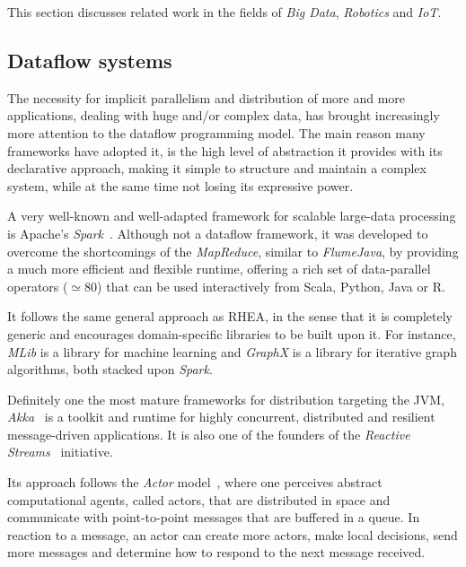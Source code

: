\documentclass[sigplan,review,anonymous]{acmart}
\begin{document}
This section discusses related work in the fields of \textit{Big Data},
\textit{Robotics} and \textit{IoT}.

\subsection{Dataflow systems}

The necessity for implicit parallelism and distribution of more and more
applications, dealing with huge and/or complex data, has brought increasingly
more attention to the dataflow programming model. The main reason many
frameworks have adopted it, is the high level of abstraction it provides with
its declarative approach, making it simple to structure and maintain a complex
system, while at the same time not losing its expressive power.

A very well-known and well-adapted framework for scalable large-data processing
is Apache's \textit{Spark}~\cite{spark}. Although not a
dataflow framework, it was developed to overcome the shortcomings of the
\textit{MapReduce}, similar to \textit{FlumeJava}, by providing a much more
efficient and flexible runtime, offering a rich set of data-parallel operators ($\simeq 80$)
that can be used interactively from Scala, Python, Java or R.

It follows the same general approach as \textsc{RHEA}, in the sense that it is
completely generic and encourages domain-specific libraries to be built upon it.
For instance, \textit{MLib} is a library for machine learning and
\textit{GraphX} is a library for iterative graph algorithms, both stacked upon
\textit{Spark}.

Definitely one the most mature frameworks for distribution targeting the JVM,
\textit{Akka}~\cite{akka} is a toolkit and runtime for highly
concurrent, distributed and resilient message-driven applications. It is also
one of the founders of the \textit{Reactive Streams}~\cite{rss} initiative.

Its approach follows the \textit{Actor} model~\cite{actor}, where one perceives
abstract computational agents, called actors, that are distributed in space and
communicate with point-to-point messages that are buffered in a queue. In
reaction to a message, an actor can create more actors, make local decisions,
send more messages and determine how to respond to the next message received.
\end{document}
